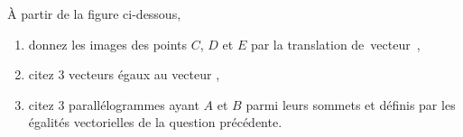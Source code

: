 \exercice À partir de la figure ci-dessous,
\begin{enumerate}
	\item donnez les images des points $C$, $D$ et $E$ par la translation de~vecteur~,
	\item citez 3 vecteurs égaux au vecteur ,
	\item citez 3 parallélogrammes ayant $A$ et $B$ parmi leurs sommets et définis par les égalités vectorielles de la question précédente.
\end{enumerate}
\begin{center}
	
\end{center}